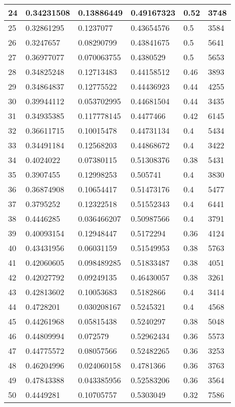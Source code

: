 \begin{longtable}{|l|l|l|l|l|l|}
24 & 0.34231508 & 0.13886449 & 0.49167323 & 0.52 & 3748 \\ \hline 
25 & 0.32861295 & 0.1237077 & 0.43654576 & 0.5 & 3584 \\ \hline 
26 & 0.3247657 & 0.08290799 & 0.43841675 & 0.5 & 5641 \\ \hline 
27 & 0.36977077 & 0.070063755 & 0.4380529 & 0.5 & 5653 \\ \hline 
28 & 0.34825248 & 0.12713483 & 0.44158512 & 0.46 & 3893 \\ \hline 
29 & 0.34864837 & 0.12775522 & 0.44436923 & 0.44 & 4255 \\ \hline 
30 & 0.39944112 & 0.053702995 & 0.44681504 & 0.44 & 3435 \\ \hline 
31 & 0.34935385 & 0.117778145 & 0.4477466 & 0.42 & 6145 \\ \hline 
32 & 0.36611715 & 0.10015478 & 0.44731134 & 0.4 & 5434 \\ \hline 
33 & 0.34491184 & 0.12568203 & 0.44868672 & 0.4 & 3422 \\ \hline 
34 & 0.4024022 & 0.07380115 & 0.51308376 & 0.38 & 5431 \\ \hline 
35 & 0.3907455 & 0.12998253 & 0.505741 & 0.4 & 3830 \\ \hline 
36 & 0.36874908 & 0.10654417 & 0.51473176 & 0.4 & 5477 \\ \hline 
37 & 0.3795252 & 0.12322518 & 0.51552343 & 0.4 & 6441 \\ \hline 
38 & 0.4446285 & 0.036466207 & 0.50987566 & 0.4 & 3791 \\ \hline 
39 & 0.40093154 & 0.12948447 & 0.5172294 & 0.36 & 4124 \\ \hline 
40 & 0.43431956 & 0.06031159 & 0.51549953 & 0.38 & 5763 \\ \hline 
41 & 0.42060605 & 0.098489285 & 0.51833487 & 0.38 & 4051 \\ \hline 
42 & 0.42027792 & 0.09249135 & 0.46430057 & 0.38 & 3261 \\ \hline 
43 & 0.42813602 & 0.10053683 & 0.5182866 & 0.4 & 3414 \\ \hline 
44 & 0.4728201 & 0.030208167 & 0.5245321 & 0.4 & 4568 \\ \hline 
45 & 0.44261968 & 0.05815438 & 0.5240297 & 0.38 & 5048 \\ \hline 
46 & 0.44809994 & 0.072579 & 0.52962434 & 0.36 & 5573 \\ \hline 
47 & 0.44775572 & 0.08057566 & 0.52482265 & 0.36 & 3253 \\ \hline 
48 & 0.46204996 & 0.024060158 & 0.4781366 & 0.36 & 3763 \\ \hline 
49 & 0.47843388 & 0.043385956 & 0.52583206 & 0.36 & 3564 \\ \hline 
50 & 0.4449281 & 0.10705757 & 0.5303049 & 0.32 & 7586 \\ \hline 
\end{longtable}